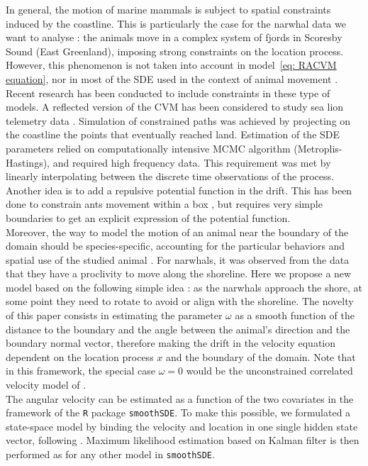 \documentclass[11pt]{article}
\newcommand {\1}{\mathbb{1}}
\begin{document}
In general, the motion of marine mammals is subject to spatial constraints induced by the coastline. This is particularly the case for the narwhal data we want to analyse : the animals move in a complex system of fjords in Scoresby Sound (East Greenland), imposing strong constraints on the location process. However, this phenomenon is not taken into account in model~\ref{eq: RACVM equation}, nor in most of the SDE used in the context of animal movement \cite{johnson_continuoustime_2008,michelot_varying-coefficient_2021,gurarie_correlated_2017}. 
Recent research has been conducted to include constraints in these type of models.
A reflected version of the CVM has been considered to study sea lion telemetry data \cite{hanks_reflected_2017}.
Simulation of constrained paths was achieved by projecting on the coastline the  points that eventually reached land. Estimation of the SDE parameters relied on computationally intensive MCMC algorithm (Metroplis-Hastings), and required high frequency data. This requirement was met by linearly interpolating between the discrete time observations of the process. Another idea is to add a repulsive potential function in the drift. This has been done to constrain ants movement within a box \cite{russell_spatially_2018}, but requires very simple boundaries to get an explicit expression of the potential function.\\
Moreover, the way to model the motion of an animal near the boundary of the domain should be species-specific, accounting for the particular behaviors and spatial use of the studied animal \cite{brillinger_simulating_2003}. For narwhals, it was observed from the data that they have a proclivity to move along the shoreline. Here we propose a new model based on the following simple idea : as the narwhals approach the shore, at some point they need to rotate to avoid or align with the shoreline. The novelty of this paper consists in estimating the parameter $\omega$ as a smooth function of the distance to the boundary and the angle between the animal's direction and the boundary normal vector, therefore making the drift in the velocity equation dependent on the location process $x$ and the boundary of the domain. Note that in this framework, the special case $\omega=0$ would be the unconstrained correlated velocity model of \cite{johnson_continuoustime_2008}.  \\ %
The angular velocity  can be estimated as a function of the two covariates in the framework of the \texttt{R} package \texttt{smoothSDE}. To make this possible, we formulated a state-space model by binding the velocity and location in one single hidden state vector, following \cite{johnson_continuoustime_2008}. Maximum likelihood estimation based on Kalman filter is then performed as for any other model in \texttt{smoothSDE}.\\
\end{document}
